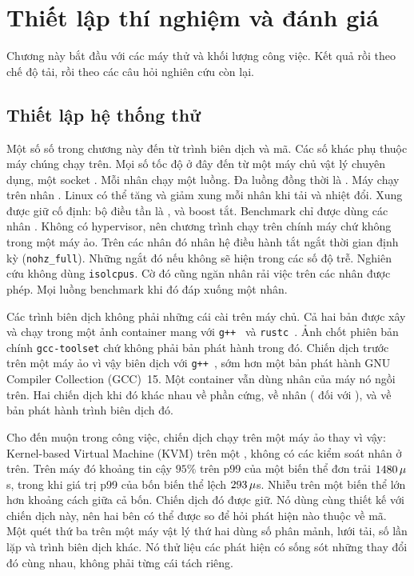 \chapter{Thiết lập thí nghiệm và đánh giá\label{chapter:eval}}

Chương này bắt đầu với các máy thử và khối lượng công việc. Kết quả rồi theo chế độ tải, rồi
theo các câu hỏi nghiên cứu còn lại.

\section{Thiết lập hệ thống thử\label{sec:testbed}}
Một số số trong chương này đến từ trình biên dịch và mã. Các số khác phụ thuộc máy chúng chạy
trên. Mọi số tốc độ ở đây đến từ một máy chủ vật lý chuyên dụng, một socket \MainCpu{}. Mỗi nhân
chạy một luồng. Đa luồng đồng thời là \MainSmt{}. Máy chạy \MainHostDistro{} trên nhân
\MainKernel{}. Linux có thể tăng và giảm xung mỗi nhân khi tải và nhiệt đổi. Xung được giữ cố
định: bộ điều tần là \MainGovernor{}, và boost tắt. Benchmark chỉ được dùng các nhân
\MainPinned{}. Không có hypervisor, nên chương trình chạy trên chính máy chứ không trong một máy
ảo. Trên các nhân đó nhân hệ điều hành tắt ngắt thời gian định kỳ (\texttt{nohz\_full}). Những
ngắt đó nếu không sẽ hiện trong các số độ trễ. Nghiên cứu không dùng \texttt{isolcpus}. Cờ đó
cũng ngăn nhân rải việc trên các nhân được phép. Mọi luồng benchmark khi đó đáp xuống một nhân.

Các trình biên dịch không phải những cái cài trên máy chủ. Cả hai bản được xây và chạy trong một
ảnh container mang \MainDistro{} với \texttt{g++~\MainGpp} và \texttt{rustc~\MainRustc}. Ảnh chốt
phiên bản chính \texttt{gcc-toolset} chứ không phải bản phát hành trong đó. Chiến dịch trước trên
một máy ảo vì vậy biên dịch với \texttt{g++~\GuestGpp}, sớm hơn một bản phát hành GNU Compiler
Collection (GCC)~15. Một container vẫn dùng nhân của máy nó ngồi trên. Hai chiến dịch khi đó
khác nhau về phần cứng, về nhân (\MainKernel{} đối với \GuestKernel{}), và về bản phát hành trình
biên dịch đó.

Cho đến muộn trong công việc, chiến dịch chạy trên một máy ảo thay vì vậy: Kernel-based Virtual
Machine (KVM) trên một \GuestCpu{}, không có các kiểm soát nhân ở trên. Trên máy đó khoảng tin
cậy $95\%$ trên p99 của một biến thể đơn trải $1480\,\mu$s, trong khi giá trị
p99 của bốn biến thể lệch $293\,\mu$s. Nhiễu trên một biến thể lớn hơn khoảng
cách giữa cả bốn. Chiến dịch đó được giữ. Nó dùng cùng thiết kế với chiến dịch này, nên hai bên
có thể được so để hỏi phát hiện nào thuộc về mã. Một quét thứ ba trên một máy vật lý thứ hai
\BmCpu{} dùng số phân mảnh, lưới tải, số lần lặp và trình biên dịch khác. Nó thử liệu các phát
hiện có sống sót những thay đổi đó cùng nhau, không phải từng cái tách riêng.

